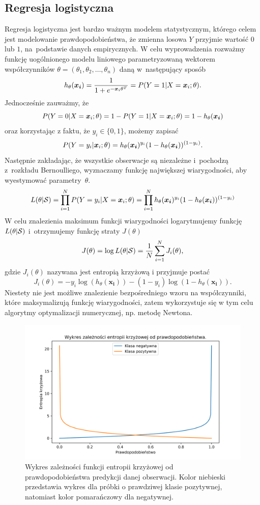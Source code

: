 \documentclass[inzynierska]{pwr_wmat_praca_dyplomowa}
\theoremstyle{plain}
\numberwithin{theorem}{chapter}
\theoremstyle{definition}
\numberwithin{theorem}{chapter}
\begin{document}
\subsection{Regresja logistyczna}
\label{reg-log}
Regresja logistyczna jest bardzo ważnym modelem statystycznym, którego celem jest modelowanie prawdopodobieństwa, że zmienna losowa $Y$ przyjmie wartość $0$ lub $1$, na~podstawie danych empirycznych. W celu wyprowadzenia rozważmy funkcję uogólnionego modelu liniowego parametryzowaną wektorem współczynników $\theta = (\theta_1, \theta_2, \dots, \theta_n)$ daną w~następujący sposób
\begin{equation}
	h_{\theta}(\boldsymbol{x_i}) = \frac{1}{1+e^{-\boldsymbol{x}_{i}\theta^T}} = P(Y = 1|X = \boldsymbol{x}_{i};\theta) \text{.}
\end{equation} 
Jednocześnie zauważmy, że
$$ P(Y = 0|X = \boldsymbol{x}_{i};\theta) = 1 - P(Y = 1|X = \boldsymbol{x}_{i};\theta) = 1 - h_{\theta}(\boldsymbol{x_i}) $$
oraz korzystając z faktu, że $y_i \in \{0,1\}$, możemy zapisać 
$$ P(Y = y_i|\boldsymbol{x}_{i};\theta) = h_{\theta}(\boldsymbol{x_i})^{y_i}(1-h_{\theta}(\boldsymbol{x_i}))^{(1-y_i)} \text{.}$$
Następnie zakładając, że wszystkie obserwacje są niezależne i~pochodzą z~rozkładu Bernoulliego, wyznaczamy funkcję największej wiarygodności, aby wyestymować parametry~$\theta$.
$$ L(\theta | \mathcal{S}) = \prod_{i=1}^N P(Y = y_i | X = \boldsymbol{x}_{i}; \theta) = \prod_{i=1}^N h_{\theta}(\boldsymbol{x_i})^{y_i}(1-h_{\theta}(\boldsymbol{x_i}))^{(1-y_i)}$$
W celu znalezienia maksimum funkcji wiarygodności logarytmujemy funkcję $L(\theta | \mathcal{S})$ i~otrzymujemy funkcję straty $J(\theta)$
$$ J(\theta) = \log L(\theta | \mathcal{S})  = \frac{1}{N} \sum_{i=1}^N J_i(\theta)\text{,}$$
gdzie $J_i(\theta)$ nazywana jest entropią krzyżową i przyjmuje postać
\begin{equation}
	\label{c-e}
	J_i(\theta) = -y_i\log(h_{\theta}(\boldsymbol{x_i})) - (1-y_i)\log(1 - h_{\theta}(\boldsymbol{x_i})) \text{.}
\end{equation}
Niestety nie jest możliwe znalezienie bezpośredniego wzoru na współczynniki, które maksymalizują funkcję wiarygodności, zatem wykorzystuje się w tym celu algorytmy optymalizacji numerycznej, np. metodę Newtona.

\begin{figure}[h]
	\includegraphics[width=\linewidth]{images/cross_entropy.png}
	\caption{Wykres zależności funkcji entropii krzyżowej od prawdopodobieństwa predykcji danej obserwacji. Kolor niebieski przedstawia wykres dla próbki o prawdziwej klasie pozytywnej, natomiast kolor pomarańczowy dla negatywnej.}
	\label{fig:cross-entropy-plot}
\end{figure}
\end{document}
